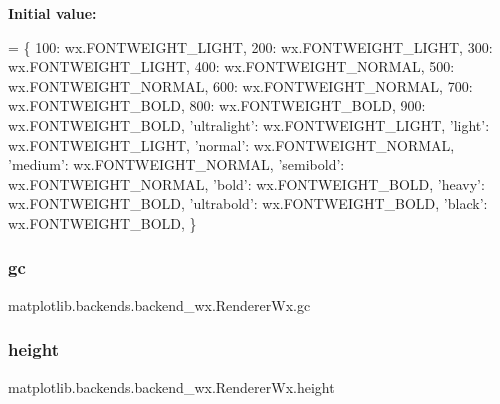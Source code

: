 {\bfseries Initial value\+:}
\begin{DoxyCode}
=  \{
        100: wx.FONTWEIGHT\_LIGHT,
        200: wx.FONTWEIGHT\_LIGHT,
        300: wx.FONTWEIGHT\_LIGHT,
        400: wx.FONTWEIGHT\_NORMAL,
        500: wx.FONTWEIGHT\_NORMAL,
        600: wx.FONTWEIGHT\_NORMAL,
        700: wx.FONTWEIGHT\_BOLD,
        800: wx.FONTWEIGHT\_BOLD,
        900: wx.FONTWEIGHT\_BOLD,
        \textcolor{stringliteral}{'ultralight'}: wx.FONTWEIGHT\_LIGHT,
        \textcolor{stringliteral}{'light'}: wx.FONTWEIGHT\_LIGHT,
        \textcolor{stringliteral}{'normal'}: wx.FONTWEIGHT\_NORMAL,
        \textcolor{stringliteral}{'medium'}: wx.FONTWEIGHT\_NORMAL,
        \textcolor{stringliteral}{'semibold'}: wx.FONTWEIGHT\_NORMAL,
        \textcolor{stringliteral}{'bold'}: wx.FONTWEIGHT\_BOLD,
        \textcolor{stringliteral}{'heavy'}: wx.FONTWEIGHT\_BOLD,
        \textcolor{stringliteral}{'ultrabold'}: wx.FONTWEIGHT\_BOLD,
        \textcolor{stringliteral}{'black'}: wx.FONTWEIGHT\_BOLD,
    \}
\end{DoxyCode}
\mbox{\label{classmatplotlib_1_1backends_1_1backend__wx_1_1RendererWx_a130cbf80d305ddfe0710684785c2cea8}} 
\subsubsection{\texorpdfstring{gc}{gc}}
{\footnotesize\ttfamily matplotlib.\+backends.\+backend\+\_\+wx.\+Renderer\+Wx.\+gc}

\mbox{\label{classmatplotlib_1_1backends_1_1backend__wx_1_1RendererWx_a86c062816292391da71ee59c81377d70}} 
\subsubsection{\texorpdfstring{height}{height}}
{\footnotesize\ttfamily matplotlib.\+backends.\+backend\+\_\+wx.\+Renderer\+Wx.\+height}

